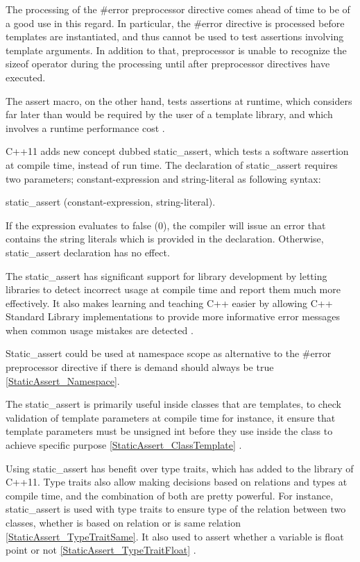 \documentclass[11pt]{report}
\begin{document}
The processing of the \#error preprocessor directive comes ahead of time to be of a good use in this regard. In particular, the \#error directive is processed before templates are instantiated, and thus cannot be used to test assertions involving template arguments. In addition to that, preprocessor is unable to recognize the sizeof operator during the processing until after preprocessor directives have executed.


The assert macro, on the other hand, tests assertions at runtime, which considers far later than would be required by the user of a template library, and which involves a runtime performance cost \cite{Stroustrup:2012:Cpp11}.


C++11 adds new concept dubbed static\_assert, which tests a software assertion at compile time, instead of run time. The declaration of static\_assert requires two parameters; constant-expression and string-literal as following syntax:
\begin{center}
static\_assert (constant-expression, string-literal).
\end{center}

If the expression evaluates to false (0), the compiler will issue an error that contains the string literals which is provided in the declaration. Otherwise, static\_assert declaration has no effect.


The static\_assert has significant support for library development by letting libraries to detect incorrect usage at compile time and report them much more effectively. It also makes learning and teaching C++ easier by allowing C++ Standard Library implementations to provide more informative error messages when common usage mistakes are detected \cite{MSDN:2012:CppModern}.


Static\_assert could be used at namespace scope as alternative to the \#error preprocessor directive if there is demand should always be true \ref{StaticAssert_Namespace}.


The static\_assert is primarily useful inside classes that are templates, to check validation of template parameters at compile time for instance, it ensure that template parameters must be unsigned int before they use inside the class  to achieve specific purpose \ref{StaticAssert_ClassTemplate} \cite{Deitel:2012:CPP}.


Using static\_assert has benefit over type traits, which has added to the library of C++11. Type traits also allow making decisions based on relations and types at compile time, and the combination of both are pretty powerful. For instance, static\_assert is used with type traits to ensure type of the relation between two classes, whether is based on relation or is same relation \ref{StaticAssert_TypeTraitSame}. It also used to assert whether a variable is float point or not \ref{StaticAssert_TypeTraitFloat} \cite{Gregorie:professionalcpp}.
\end{document}
